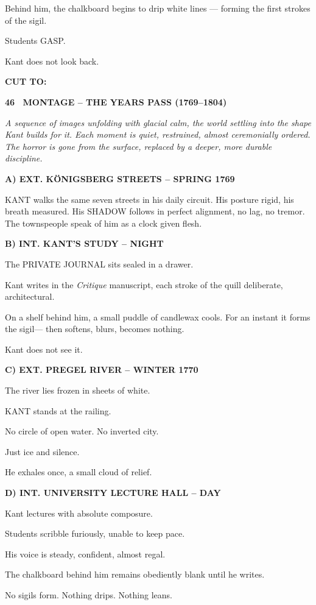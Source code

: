 \documentclass[12pt]{article}
\newcommand{\scene}[2]{%
  \vspace{1.8\baselineskip}%
  \noindent\textbf{#1 \ #2}\par\vspace{0.4\baselineskip}%
}
\newcommand{\transition}[1]{%
  \vspace{0.6\baselineskip}%
  \begin{flushright}\textbf{#1}\end{flushright}%
}
\begin{document}
Behind him, the chalkboard begins to drip white lines —
forming the first strokes of the sigil.

Students GASP.

Kant does not look back.

\transition{CUT TO:}

\scene{46}{MONTAGE -- THE YEARS PASS (1769--1804)}

\textit{A sequence of images unfolding with glacial calm, the world settling into the shape Kant builds for it. Each moment is quiet, restrained, almost ceremonially ordered. The horror is gone from the surface, replaced by a deeper, more durable discipline.}

\textbf{A) EXT. KÖNIGSBERG STREETS -- SPRING 1769}

KANT walks the same seven streets in his daily circuit.
His posture rigid, his breath measured.
His SHADOW follows in perfect alignment, no lag, no tremor.
The townspeople speak of him as a clock given flesh.

\textbf{B) INT. KANT'S STUDY -- NIGHT}

The PRIVATE JOURNAL sits sealed in a drawer.

Kant writes in the \textit{Critique} manuscript,
each stroke of the quill deliberate, architectural.

On a shelf behind him, a small puddle of candlewax cools.
For an instant it forms the sigil—
then softens, blurs, becomes nothing.

Kant does not see it.

\textbf{C) EXT. PREGEL RIVER -- WINTER 1770}

The river lies frozen in sheets of white.

KANT stands at the railing.

No circle of open water.
No inverted city.

Just ice and silence.

He exhales once, a small cloud of relief.

\textbf{D) INT. UNIVERSITY LECTURE HALL -- DAY}

Kant lectures with absolute composure.

Students scribble furiously, unable to keep pace.

His voice is steady, confident, almost regal.

The chalkboard behind him remains obediently blank until he writes.

No sigils form.
Nothing drips.
Nothing leans.
\end{document}
